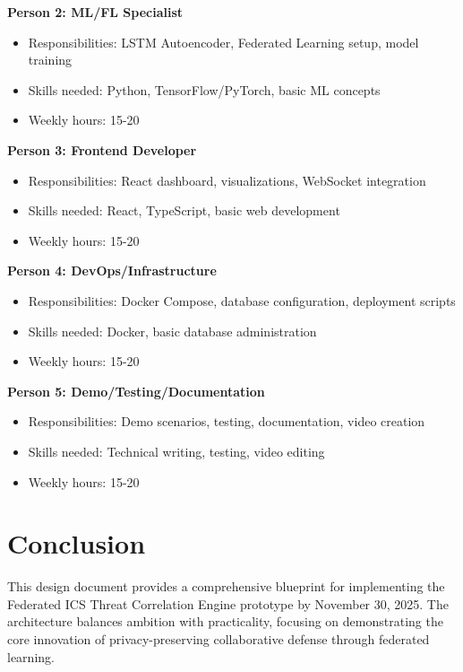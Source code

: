 \documentclass[12pt,a4paper]{article}
\begin{document}
\textbf{Person 2: ML/FL Specialist}
\begin{itemize}[leftmargin=1cm,itemsep=0pt]
    \item Responsibilities: LSTM Autoencoder, Federated Learning setup, model training
    \item Skills needed: Python, TensorFlow/PyTorch, basic ML concepts
    \item Weekly hours: 15-20
\end{itemize}

\textbf{Person 3: Frontend Developer}
\begin{itemize}[leftmargin=1cm,itemsep=0pt]
    \item Responsibilities: React dashboard, visualizations, WebSocket integration
    \item Skills needed: React, TypeScript, basic web development
    \item Weekly hours: 15-20
\end{itemize}

\textbf{Person 4: DevOps/Infrastructure}
\begin{itemize}[leftmargin=1cm,itemsep=0pt]
    \item Responsibilities: Docker Compose, database configuration, deployment scripts
    \item Skills needed: Docker, basic database administration
    \item Weekly hours: 15-20
\end{itemize}

\textbf{Person 5: Demo/Testing/Documentation}
\begin{itemize}[leftmargin=1cm,itemsep=0pt]
    \item Responsibilities: Demo scenarios, testing, documentation, video creation
    \item Skills needed: Technical writing, testing, video editing
    \item Weekly hours: 15-20
\end{itemize}

\section{Conclusion}

This design document provides a comprehensive blueprint for implementing the Federated ICS Threat Correlation Engine prototype by November 30, 2025. The architecture balances ambition with practicality, focusing on demonstrating the core innovation of privacy-preserving collaborative defense through federated learning.
\end{document}
